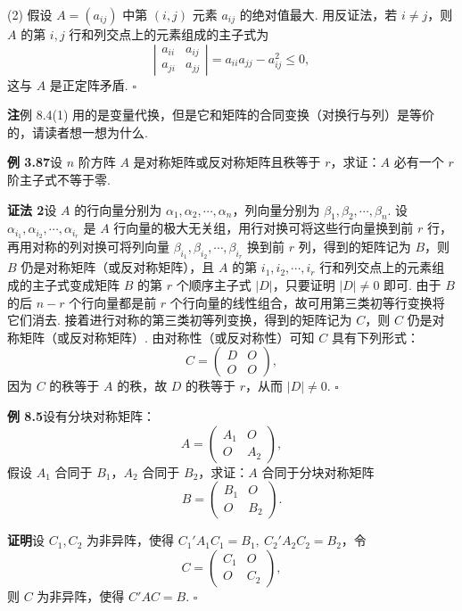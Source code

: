 \documentclass[UTF8,12pt,a4paper,fontset=fandol]{ctexart}
\begin{document}
(2) 假设 $A=(a_{ij})$ 中第 $(i,j)$ 元素 $a_{ij}$ 的绝对值最大. 用反证法，若 $i\ne j$，则 $A$ 的第 $i,j$ 行和列交点上的元素组成的主子式为
\[
\left|\begin{array}{cc}
a_{ii} & a_{ij}\\
a_{ji} & a_{jj}
\end{array}\right|=a_{ii}a_{jj}-a_{ij}^2\le 0,
\]
这与 $A$ 是正定阵矛盾. $\ensuremath{\square}$

\noindent\textbf{注}\quad 例 8.4(1) 用的是变量代换，但是它和矩阵的合同变换（对换行与列）是等价的，请读者想一想为什么.

\noindent\textbf{例 3.87}\quad 设 $n$ 阶方阵 $A$ 是对称矩阵或反对称矩阵且秩等于 $r$，求证：$A$ 必有一个 $r$ 阶主子式不等于零.

\noindent\textbf{证法 2}\quad 设 $A$ 的行向量分别为 $\alpha_1,\alpha_2,\cdots,\alpha_n$，列向量分别为 $\beta_1,\beta_2,\cdots,\beta_n$. 设 $\alpha_{i_1},\alpha_{i_2},\cdots,\alpha_{i_r}$ 是 $A$ 行向量的极大无关组，用行对换可将这些行向量换到前 $r$ 行，再用对称的列对换可将列向量 $\beta_{i_1},\beta_{i_2},\cdots,\beta_{i_r}$ 换到前 $r$ 列，得到的矩阵记为 $B$，则 $B$ 仍是对称矩阵（或反对称矩阵），且 $A$ 的第 $i_1,i_2,\cdots,i_r$ 行和列交点上的元素组成的主子式变成矩阵 $B$ 的第 $r$ 个顺序主子式 $|D|$，只要证明 $|D|\ne 0$ 即可. 由于 $B$ 的后 $n-r$ 个行向量都是前 $r$ 个行向量的线性组合，故可用第三类初等行变换将它们消去. 接着进行对称的第三类初等列变换，得到的矩阵记为 $C$，则 $C$ 仍是对称矩阵（或反对称矩阵）. 由对称性（或反对称性）可知 $C$ 具有下列形式：
\[
C=\left(\begin{array}{cc}
D & O\\
O & O
\end{array}\right),
\]
因为 $C$ 的秩等于 $A$ 的秩，故 $D$ 的秩等于 $r$，从而 $|D|\ne 0$. $\ensuremath{\square}$

\noindent\textbf{例 8.5}\quad 设有分块对称矩阵：
\[
A=\left(\begin{array}{cc}
A_1 & O\\
O & A_2
\end{array}\right),
\]
假设 $A_1$ 合同于 $B_1$，$A_2$ 合同于 $B_2$，求证：$A$ 合同于分块对称矩阵
\[
B=\left(\begin{array}{cc}
B_1 & O\\
O & B_2
\end{array}\right).
\]

\noindent\textbf{证明}\quad 设 $C_1,C_2$ 为非异阵，使得 $C_1'A_1C_1=B_1,\ C_2'A_2C_2=B_2$，令
\[
C=\left(\begin{array}{cc}
C_1 & O\\
O & C_2
\end{array}\right),
\]
则 $C$ 为非异阵，使得 $C'AC=B$. $\ensuremath{\square}$
\end{document}
